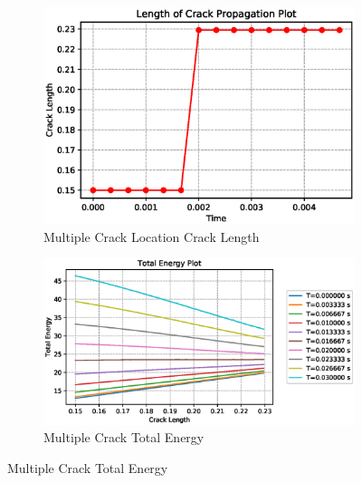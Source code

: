 \documentclass[a4paper,11pt]{article}
\begin{document}
\begin{figure}[h!]
	\begin{subfigure}[b]{0.49\linewidth}
		\centering
		\includegraphics[width=\linewidth]{picture/conference/multicrack-cracklength}
		\caption{Multiple Crack Location Crack Length}
		\label{fig:multicrack-cracklength}
	\end{subfigure}
\begin{subfigure}[b]{0.49\linewidth}
	\centering
	\includegraphics[width=\linewidth]{picture/conference/multicrack-totalenergy}
	\caption{Multiple Crack Total Energy}
	\label{fig:multicrack-totalenergy}
\end{subfigure}
\end{figure}
\end{document}
